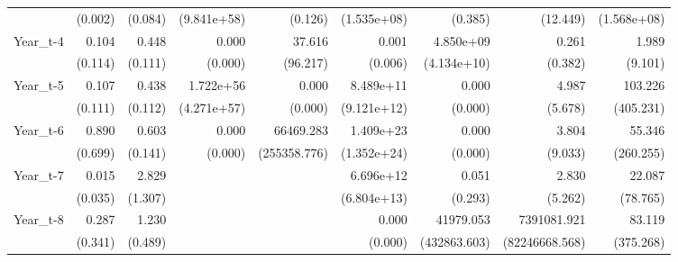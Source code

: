 \begin{table}[htbp]
\begin{tabular}{l*{8}{D{.}{.}{-1}}}
                    &     (0.002)         &     (0.084)         & (9.841e+58)         &     (0.126)         & (1.535e+08)         &     (0.385)         &    (12.449)         & (1.568e+08)         \\
Year\_t-4            &       0.104\sym{**} &       0.448\sym{***}&       0.000         &      37.616         &       0.001         &   4.850e+09\sym{***}&       0.261         &       1.989         \\
                    &     (0.114)         &     (0.111)         &     (0.000)         &    (96.217)         &     (0.006)         & (4.134e+10)         &     (0.382)         &     (9.101)         \\
Year\_t-5            &       0.107\sym{**} &       0.438\sym{***}&   1.722e+56\sym{***}&       0.000\sym{***}&   8.489e+11\sym{**} &       0.000\sym{**} &       4.987         &     103.226         \\
                    &     (0.111)         &     (0.112)         & (4.271e+57)         &     (0.000)         & (9.121e+12)         &     (0.000)         &     (5.678)         &   (405.231)         \\
Year\_t-6            &       0.890         &       0.603\sym{**} &       0.000\sym{***}&   66469.283\sym{***}&   1.409e+23\sym{***}&       0.000\sym{***}&       3.804         &      55.346         \\
                    &     (0.699)         &     (0.141)         &     (0.000)         &(255358.776)         & (1.352e+24)         &     (0.000)         &     (9.033)         &   (260.255)         \\
Year\_t-7            &       0.015\sym{*}  &       2.829\sym{**} &                     &                     &   6.696e+12\sym{***}&       0.051         &       2.830         &      22.087         \\
                    &     (0.035)         &     (1.307)         &                     &                     & (6.804e+13)         &     (0.293)         &     (5.262)         &    (78.765)         \\
Year\_t-8            &       0.287         &       1.230         &                     &                     &       0.000\sym{*}  &   41979.053         & 7391081.921         &      83.119         \\
                    &     (0.341)         &     (0.489)         &                     &                     &     (0.000)         &(432863.603)         &(82246668.568)         &   (375.268)         \\

\end{tabular}
\end{table}
